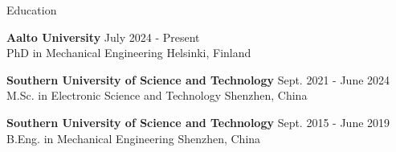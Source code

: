 \documentclass{resume} %
\begin{document}

\begin{rSection}{Education}


{\bf Aalto University} \hfill {July 2024 - Present} \\ 
{PhD in Mechanical Engineering} \hfill {Helsinki, Finland}

{\bf Southern University of Science and Technology} \hfill { Sept. 2021 - June 2024} \\ 
{M.Sc. in Electronic Science and Technology} \hfill {Shenzhen, China}

{\bf Southern University of Science and Technology} \hfill { Sept. 2015 - June 2019} \\ 
{B.Eng. in Mechanical Engineering} \hfill {Shenzhen, China}

\end{rSection}

\end{document}
